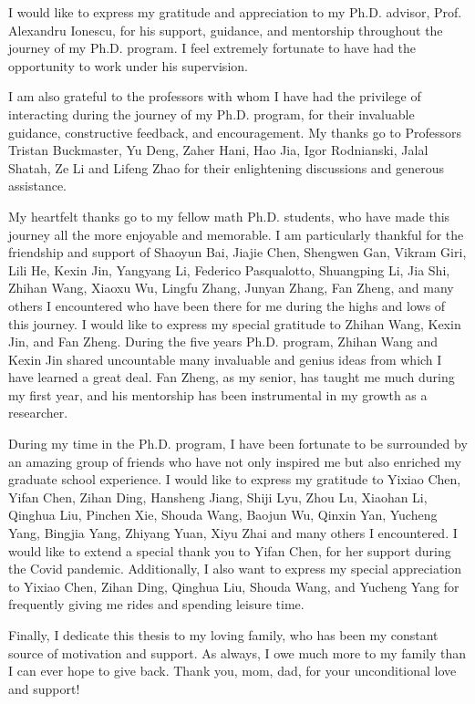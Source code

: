 I would like to express my gratitude and appreciation to my Ph.D. advisor, Prof. Alexandru Ionescu, for his support, guidance, and mentorship throughout the journey of my Ph.D. program. I feel extremely fortunate to have had the opportunity to work under his supervision.

I am also grateful to the professors with whom I have had the privilege of interacting during the journey of my Ph.D. program, for their invaluable guidance, constructive feedback, and encouragement. My thanks go to Professors Tristan Buckmaster, Yu Deng, Zaher Hani, Hao Jia, Igor Rodnianski, Jalal Shatah, Ze Li and Lifeng Zhao for their enlightening discussions and generous assistance.

My heartfelt thanks go to my fellow math Ph.D. students, who have made this journey all the more enjoyable and memorable. I am particularly thankful for the friendship and support of Shaoyun Bai, Jiajie Chen, Shengwen Gan, Vikram Giri, Lili He, Kexin Jin, Yangyang Li, Federico Pasqualotto, Shuangping Li, Jia Shi, Zhihan Wang, Xiaoxu Wu, Lingfu Zhang, Junyan Zhang, Fan Zheng, and many others I encountered who have been there for me during the highs and lows of this journey. I would like to express my special gratitude to Zhihan Wang, Kexin Jin, and Fan Zheng. During the five years Ph.D. program, Zhihan Wang and Kexin Jin shared uncountable many invaluable and genius ideas from which I have learned a great deal.  Fan Zheng, as my senior, has taught me much during my first year, and his mentorship has been instrumental in my growth as a researcher.


During my time in the Ph.D. program, I have been fortunate to be surrounded by an amazing group of friends who have not only inspired me but also enriched my graduate school experience. I would like to express my gratitude to Yixiao Chen, Yifan Chen, Zihan Ding, Hansheng Jiang, Shiji Lyu, Zhou Lu, Xiaohan Li, Qinghua Liu, Pinchen Xie, Shouda Wang, Baojun Wu, Qinxin Yan, Yucheng Yang, Bingjia Yang, Zhiyang Yuan, Xiyu Zhai and many others I encountered. I would like to extend a special thank you to Yifan Chen, for her support during the Covid pandemic. Additionally, I also want to express my special appreciation to Yixiao Chen, Zihan Ding, Qinghua Liu, Shouda Wang, and Yucheng Yang for frequently giving me rides and spending leisure time.

Finally, I dedicate this thesis to my loving family, who has been my constant source of motivation and support. As always, I owe much more to my family than I can ever hope to give back. Thank you, mom, dad, for your unconditional love and support!

\newpage

\ 

\vspace{20em}

